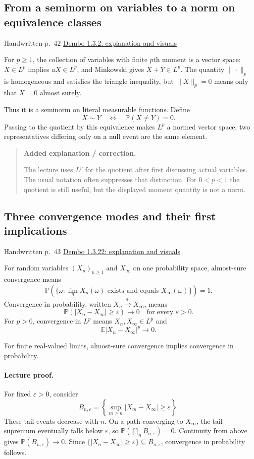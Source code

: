 \documentclass[11pt,letterpaper]{article}
\newcommand{\lecturesection}[1]{\subsection{#1}}
\begin{document}
\hypertarget{l5-s7}{}
\lecturesection{From a seminorm on variables to a norm on equivalence classes}
{\small\textcolor{lectureink}{Handwritten p.\ 42} \quad \href{https://josephrbailey.com/probability/\#entry-1-3-2}{Dembo 1.3.2: explanation and visuals}}

For $p\ge1$, the collection of variables with finite $p$th moment is a vector space: $X\in L^p$ implies $aX\in L^p$, and Minkowski gives $X+Y\in L^p$. The quantity $\|\cdot\|_p$ is homogeneous and satisfies the triangle inequality, but $\|X\|_p=0$ means only that $X=0$ almost surely.

Thus it is a seminorm on literal measurable functions. Define \[X\sim Y\quad\Longleftrightarrow\quad\mathbb P(X\ne Y)=0.\] Passing to the quotient by this equivalence makes $L^p$ a normed vector space; two representatives differing only on a null event are the same element.

\begin{quote}\small\textbf{Added explanation / correction.}

The lecture uses $L^p$ for the quotient after first discussing actual variables. The usual notation often suppresses that distinction. For $0<p<1$ the quotient is still useful, but the displayed moment quantity is not a norm.
\end{quote}

\hypertarget{l5-s8}{}
\lecturesection{Three convergence modes and their first implications}
{\small\textcolor{lectureink}{Handwritten p.\ 43} \quad \href{https://josephrbailey.com/probability/\#entry-1-3-22}{Dembo 1.3.22: explanation and visuals}}

For random variables $(X_n)_{n\ge1}$ and $X_\infty$ on one probability space, almost-sure convergence means \[\mathbb P(\{\omega:\lim_nX_n(\omega)\text{ exists and equals }X_\infty(\omega)\})=1.\] Convergence in probability, written $X_n\xrightarrow{\mathbb P}X_\infty$, means \[\mathbb P(|X_n-X_\infty|\ge\varepsilon)\longrightarrow0\quad\text{for every }\varepsilon>0.\] For $p>0$, convergence in $L^p$ means $X_n,X_\infty\in L^p$ and \[\mathbb E|X_n-X_\infty|^p\longrightarrow0.\]

For finite real-valued limits, almost-sure convergence implies convergence in probability.

\paragraph{Lecture proof.}
For fixed $\varepsilon>0$, consider \[B_{n,\varepsilon}=\left\{\sup_{m\ge n}|X_m-X_\infty|\ge\varepsilon\right\}.\] These tail events decrease with $n$. On a path converging to $X_\infty$, the tail supremum eventually falls below $\varepsilon$, so $\mathbb P(\bigcap_n B_{n,\varepsilon})=0$. Continuity from above gives $\mathbb P(B_{n,\varepsilon})\to0$. Since $\{|X_n-X_\infty|\ge\varepsilon\}\subseteq B_{n,\varepsilon}$, convergence in probability follows.
\end{document}
